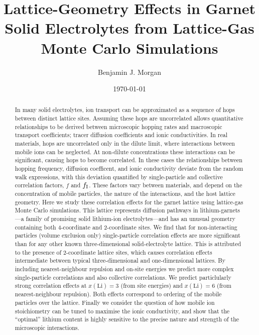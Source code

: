 \documentclass[aps,prb,twocolumn,superscriptaddress,reprint]{revtex4-1}
\begin{document}
\title{Lattice-Geometry Effects in Garnet Solid Electrolytes from Lattice-Gas Monte Carlo Simulations}
\author{Benjamin J. Morgan}

\date{\today}

\begin{abstract}
In many solid electrolytes, ion transport can be approximated as a sequence of hops between distinct lattice sites. Assuming these hops are uncorrelated allows quantitative relationships to be derived between microscopic hopping rates and macroscopic transport coefficients; tracer diffusion coefficients and ionic conductivities. In real materials, hops are uncorrelated only in the dilute limit, where interactions between mobile ions can be neglected. At non-dilute concentrations these interactions can be significant, causing hops to become correlated. In these cases the relationships between hopping frequency, diffusion coefficent, and ionic conductivity deviate from the random walk expressions, with this deviation quantified by single-particle and collective correlation factors, $f$ and $f_{\mathrm{I}}$. These factors vary between materials, and depend on the concentration of mobile particles, the nature of the interactions, and the host lattice geometry. 
Here we study these correlation effects for the garnet lattice using lattice-gas Monte Carlo simulations. This lattice represents diffusion pathways in lithium-garnets---a family of promising solid lithium-ion electrolytes---and has an unusual geometry containing both 4-coordinate and 2-coordinate sites. We find that for non-interacting particles (volume exclusion only) single-particle correlation effects are more significant than for any other known three-dimensional solid-electrolyte lattice. This is attributed to the presence of 2-coordinate lattice sites, which causes correlation effects intermediate between typical three-dimensional and one-dimensional lattices. By including nearest-neighbour repulsion and on-site energies we predict more complex single-particle correlations and also  collective correlations. We predict particlularly strong correlation effects at $x(\mathrm{Li})=3$ (from site energies) and $x(\mathrm{Li})=6$ (from nearest-neighbour repulsion). Both effects correspond to ordering of the mobile particles over the lattice. Finally we consider the question of how mobile ion stoichiometry can be tuned to maximise the ionic conductivity, and show that the ``optimal'' lithium content is highly sensitive to the precise nature and strength of the microscopic interactions. 
\end{abstract}
\end{document}

